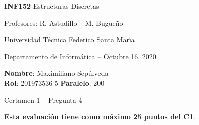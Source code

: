 \documentclass[legalpaper,10pt]{article}
\begin{document}
\thispagestyle{empty}

\begin{minipage}[t]{0.6\textwidth}

{\LARGE \textbf{INF152} Estructuras Discretas}

{\large Profesores: R. Astudillo -- M. Bugueño}

Universidad Técnica Federico Santa Mar\'{\i}a

Departamento de Informática -- Octubre 16, 2020.

\end{minipage}
\hfill
\begin{minipage}[t]{0.35\textwidth}
\textbf{Nombre}: Maximiliano Sepúlveda\\[0.3cm]
\textbf{Rol}: 201973536-5 \textbf{Paralelo}: 200
\end{minipage}

\vspace{0.8cm}

{\Large Certamen 1 -- Pregunta 4}

\vspace{0.4cm}

\textbf{Esta evaluación tiene como máximo 25 puntos del C1}.
\end{document}
